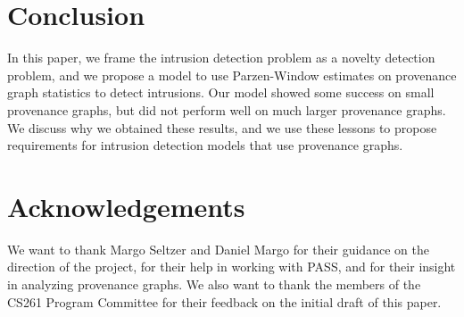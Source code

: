 \documentclass[10pt,twocolumn]{article}
\begin{document}
\section{Conclusion}

In this paper, we frame the intrusion detection problem as a novelty detection problem, and we propose a model to use Parzen-Window estimates on provenance graph statistics to detect intrusions. Our model showed some success on small provenance graphs, but did not perform well on much larger provenance graphs. We discuss why we obtained these results, and we use these lessons to propose requirements for intrusion detection models that use provenance graphs.

%

\section{Acknowledgements}
We want to thank Margo Seltzer and Daniel Margo for their guidance on the direction of the project, for their help in working with PASS, and for their insight in analyzing provenance graphs. We also want to thank the members of the CS261 Program Committee for their feedback on the initial draft of this paper.


%
\end{document}
